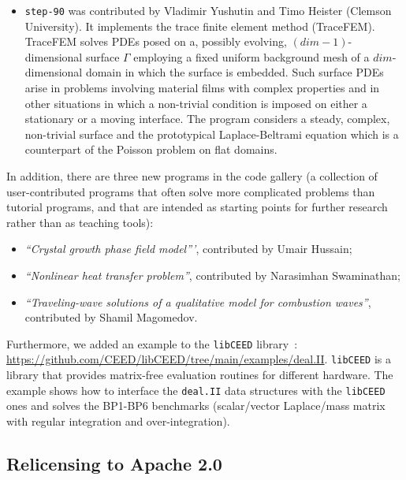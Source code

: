 \documentclass{ansarticle-preprint}
\newcommand{\specialword}[1]{\texttt{#1}}
\newcommand{\dealii}{{\specialword{deal.II}}\xspace}
\begin{document}
\begin{itemize}
    within matrix-free loops in \dealii.
  \item
    \texttt{step-90} was contributed by Vladimir Yushutin and Timo Heister (Clemson University).
    It implements the trace finite element method (TraceFEM). TraceFEM solves PDEs
    posed on a, possibly evolving, $(dim-1)$-dimensional surface $\Gamma$ employing
    a fixed uniform background mesh of a $dim$-dimensional domain in which
    the surface is embedded. Such surface PDEs arise in problems involving
    material films with complex properties and in other situations in which
    a non-trivial condition is imposed on either a stationary or a moving interface.
    The program considers a steady, complex, non-trivial surface and the prototypical
    Laplace-Beltrami equation which is a counterpart of
    the Poisson problem on flat domains.
\end{itemize}

In addition, there are three new programs in the code gallery (a collection of
user-contributed programs that often solve more complicated problems
than tutorial programs, and that are intended as starting points for further
research rather than as teaching tools):
\begin{itemize}
  \item \textit{``Crystal growth phase field model'''},
    contributed by Umair Hussain;
  \item \textit{``Nonlinear heat transfer problem''}, contributed by
    Narasimhan Swaminathan;
  \item \textit{``Traveling-wave solutions of a qualitative model for combustion waves''}, contributed by
    Shamil Magomedov.
\end{itemize}

Furthermore, we added an example to the \texttt{libCEED}
library~\cite{brown2021libceed}: \url{https://github.com/CEED/libCEED/tree/main/examples/deal.II}. \texttt{libCEED} is a library
that provides matrix-free evaluation routines for different hardware. The
example shows how to interface the \dealii{} data structures with the \texttt{libCEED} ones
and solves the BP1-BP6 benchmarks (scalar/vector Laplace/mass matrix with
regular integration and over-integration).


\subsection{Relicensing to Apache 2.0}\label{sec:license}
\end{document}
